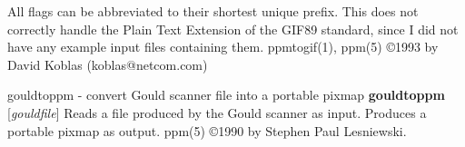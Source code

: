 \par
All flags can be abbreviated to their shortest unique prefix.
This does not correctly handle the Plain Text Extension of the GIF89
standard, since I did not have any example input files containing them.
ppmtogif(1), ppm(5)
\copyright 1993 by David Koblas (koblas@netcom.com)
%
 
%

\newpage
%

gouldtoppm - convert Gould scanner file into a portable pixmap
{\bf gouldtoppm}
{\rm [}{\it gouldfile}{\rm ]}
Reads a file produced by the Gould scanner as input.
Produces a portable pixmap as output.
ppm(5)
\copyright 1990 by Stephen Paul Lesniewski.
%
 
%

